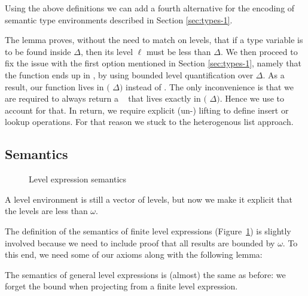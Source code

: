 \documentclass[manuscript,screen,review,anonymous]{acmart}
\begin{document}
Using the above definitions we can add a fourth alternative for the 
encoding of semantic type environments described in Section \ref{sec:types-1}.

\SFVarLess
\SFFEnv

The lemma  proves, without the need to match on levels, that
if a type variable is to be found inside $\Delta$, then its level $\ell$ must be less than
 $\Delta$.
We then proceed to fix the issue with the first option mentioned in Section \ref{sec:types-1},
namely that the function ends up in , 
by using bounded level quantification over  $\Delta$.
As a result, our function lives in $($ $\Delta)$ 
instead of .
The only inconvenience is that we are required to always return a \ASet~
that lives exactly in $($ $\Delta)$.
Hence we use  to account for that.
In return, we require explicit (un-) lifting to define insert or lookup operations.
For that reason we stuck to the heterogenous list approach.

\subsection{Semantics}
\label{sec:semantics-1}
\begin{figure}[tp]
  \begin{minipage}[t]{0.45\linewidth}
    \EHLSemFin
  \end{minipage}
  \begin{minipage}[t]{0.45\linewidth}
    \EHLSemAny
  \end{minipage}
  \caption{Level expression semantics}
  \label{fig:eh-semantics-level-expressions}
\end{figure}

A level environment is still a vector of levels, but now we make it
explicit that the levels are less than $\omega$.

\EHLEnvSem

The definition of the semantics of finite level expressions (Figure~\ref{fig:eh-semantics-level-expressions}) is
slightly involved because we need to include proof that all results
are bounded by $\omega$. To this end, we need some of our axioms along
with the following lemma:
\EHzeroLtomega

The semantics of general level expressions is (almost) the same as
before: we forget the bound when projecting from a finite level
expression. 
\end{document}
